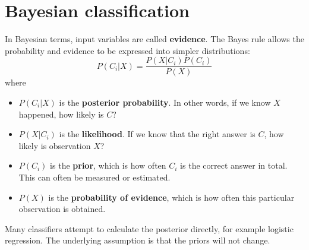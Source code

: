 \documentclass[CS5104-Notes.tex]{subfiles}
\begin{document}
\section{Bayesian classification}
In Bayesian terms, input variables are called \textbf{evidence}. The Bayes rule allows the probability and evidence to be expressed into simpler distributions:
\begin{equation}
P(C_{i} | X) = \frac{P(X|C_{i}) P(C_{i})}{P(X)}
\end{equation}
where 
\begin{itemize}
\item $P(C_{i} | X)$ is the \textbf{posterior probability}. In other words, if we know $X$ happened, how likely is $C$?
\item $P(X|C_{i})$ is the \textbf{likelihood}. If we know that the right answer is $C$, how likely is observation $X$?
\item $P(C_{i})$ is the \textbf{prior}, which is how often $C_{i}$ is the correct answer in total. This can often be measured or estimated.
\item $P(X)$ is the \textbf{probability of evidence}, which is how often this particular observation is obtained.
\end{itemize}
Many classifiers attempt to calculate the posterior directly, for example logistic regression. The underlying assumption is that the priors will not change. 
\end{document}
